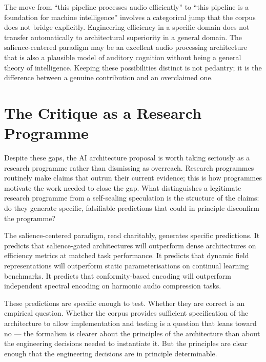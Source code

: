 \begin{dangerzone}
The move from ``this pipeline processes audio efficiently''
to ``this pipeline is a foundation for machine intelligence''
involves a categorical jump that the corpus does not bridge
explicitly. Engineering efficiency in a specific domain does
not transfer automatically to architectural superiority in
a general domain. The salience-centered paradigm may be an
excellent audio processing architecture that is also a
plausible model of auditory cognition without being a
general theory of intelligence. Keeping these possibilities
distinct is not pedantry; it is the difference between a
genuine contribution and an overclaimed one.
\end{dangerzone}

\section{The Critique as a Research Programme}
\label{sec:research-programme}

Despite these gaps, the AI architecture proposal is worth
taking seriously as a research programme rather than
dismissing as overreach. Research programmes routinely
make claims that outrun their current evidence; this is
how programmes motivate the work needed to close the gap.
What distinguishes a legitimate research programme from
a self-sealing speculation is the structure of the claims:
do they generate specific, falsifiable predictions that
could in principle disconfirm the programme?

The salience-centered paradigm, read charitably, generates
specific predictions. It predicts that salience-gated
architectures will outperform dense architectures on
efficiency metrics at matched task performance. It predicts
that dynamic field representations will outperform static
parameterisations on continual learning benchmarks. It
predicts that conformity-based encoding will outperform
independent spectral encoding on harmonic audio
compression tasks.

These predictions are specific enough to test. Whether
they are correct is an empirical question. Whether the
corpus provides sufficient specification of the architecture
to allow implementation and testing is a question that
leans toward no --- the formalism is clearer about the
principles of the architecture than about the engineering
decisions needed to instantiate it. But the principles
are clear enough that the engineering decisions are in
principle determinable.

